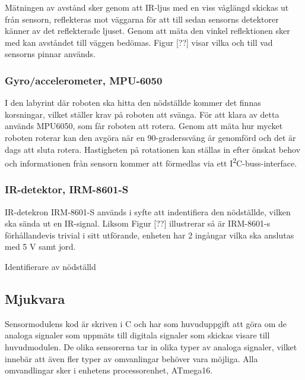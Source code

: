 \documentclass[11pt]{article}
\begin{document}
\begin{flushleft}
Mätningen av avstånd sker genom att IR-ljus med en viss våglängd skickas ut från sensorn, reflekteras mot väggarna för att till sedan sensorns detektorer känner av det reflekterade ljuset. Genom att mäta den vinkel reflektionen sker med kan avståndet till väggen bedömas.
Figur [??] visar vilka och till vad sensorns pinnar används.


\subsubsection{Gyro/accelerometer, MPU-6050}
I den labyrint där roboten ska hitta den nödställde kommer det finnas korsningar, vilket ställer krav på roboten att svänga. För att klara av detta används MPU6050, som får roboten att rotera. Genom att mäta hur mycket roboten roterar kan den avgöra när en 90-graderssväng är genomförd och det är dags att sluta rotera. Hastigheten på rotationen kan ställas in efter önskat behov och informationen från sensorn kommer att förmedlas via ett I\textsuperscript2C-buss-interface.
 
\subsubsection{IR-detektor, IRM-8601-S}
IR-detekron IRM-8601-S används i syfte att indentifiera den nödställde, vilken ska sända ut en IR-signal. Liksom Figur [??] illustrerar så är IRM-8601-s förhållandevis trivial i sitt utförande, enheten har 2 ingångar vilka ska anslutas med 5 V samt jord. 

\item[Identifierare av nödställd] \hfill \\


\subsection{Mjukvara}
Sensormodulens kod är skriven i C och har som huvuduppgift att göra om de analoga signaler som uppmäts till digitala signaler som skickas visare till huvudmodulen. De olika sensorerna tar in olika typer av analoga signaler, vilket innebär att även fler typer av omvanlingar behöver vara möjliga. Alla omvandlingar sker i enhetens processorenhet, ATmega16. 


\end{flushleft}
\end{document}
